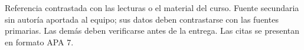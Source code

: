 \documentclass[10pt,twocolumn]{article}
\begin{document}
{\footnotesize \textdagger{} Referencia contrastada con las lecturas o el material del curso. \textdaggerdbl{} Fuente secundaria sin autoría aportada al equipo; sus datos deben contrastarse con las fuentes primarias. Las demás deben verificarse antes de la entrega. Las citas se presentan en formato APA 7.}
\end{document}
